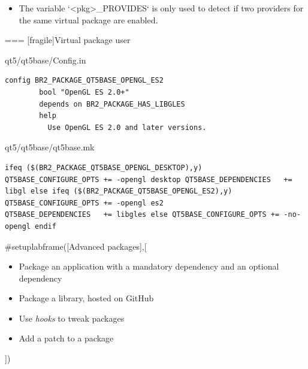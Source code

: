 \begin{itemize}
\item The variable `<pkg>_PROVIDES` is only used to detect if two
  providers for the same virtual package are enabled.
\end{itemize}



=== [fragile]{Virtual package user}

  \begin{block}{qt5/qt5base/Config.in}
{\small
\begin{verbatim}
config BR2_PACKAGE_QT5BASE_OPENGL_ES2
        bool "OpenGL ES 2.0+"
        depends on BR2_PACKAGE_HAS_LIBGLES
        help
          Use OpenGL ES 2.0 and later versions.
\end{verbatim}}
\end{block}

\begin{block}{qt5/qt5base/qt5base.mk}
\begin{verbatim}
ifeq ($(BR2_PACKAGE_QT5BASE_OPENGL_DESKTOP),y)
QT5BASE_CONFIGURE_OPTS += -opengl desktop QT5BASE_DEPENDENCIES   += libgl else ifeq ($(BR2_PACKAGE_QT5BASE_OPENGL_ES2),y)
QT5BASE_CONFIGURE_OPTS += -opengl es2
QT5BASE_DEPENDENCIES   += libgles else QT5BASE_CONFIGURE_OPTS += -no-opengl endif
\end{verbatim}
\end{block}



#setuplabframe([Advanced packages],[
  \begin{itemize}
  \item Package an application with a mandatory dependency and an
    optional dependency
  \item Package a library, hosted on GitHub
  \item Use {\em hooks} to tweak packages
  \item Add a patch to a package
  \end{itemize}
])
